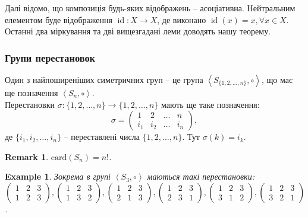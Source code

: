 \documentclass[a4paper, 10pt]{article}
\theoremstyle{theoremdd}
\theoremstyle{theoremdd}
\theoremstyle{theoremdd}
\theoremstyle{theoremdd}
\theoremstyle{theoremdd}
\newtheorem{example}[theorem]{Example}
\theoremstyle{theoremdd}
\theoremstyle{theoremdd}
\theoremstyle{theoremdd}
\theoremstyle{theoremdd}
\theoremstyle{theoremdd}
\theoremstyle{theoremdd}
\newtheorem{remark}[theorem]{Remark}
\theoremstyle{theoremdd}
\theoremstyle{theoremdd}
\theoremstyle{theoremdd}
\theoremstyle{theoremdd}
\DeclareMathOperator{\id}{id}
\begin{document}
Далі відомо, що композиція будь-яких відображень -- асоціативна. Нейтральним елементом буде відображення $\id \colon X \to X$, де виконано $\id(x) = x, \forall x \in X$.\\
Останні два міркування та дві вищезгадані леми доводять нашу теорему.

\subsubsection{Групи перестановок}
Один з найпоширеніших симетричних груп -- це група $\left<S_{\{1,2,\dots,n\}}, \circ \right>$, що має ще позначення $\left<S_n, \circ \right>$.\\
Перестановки $\sigma \colon \{1,2,\dots,n\} \to \{1,2,\dots,n\}$ мають ще таке позначення:
$$ \sigma = \begin{pmatrix}
1 & 2 & \dots & n \\
i_1 & i_2 & \dots & i_n
\end{pmatrix},$$
де $\{i_1,i_2,\dots,i_n\}$ -- переставлені числа $\{1,2,\dots,n\}$. Тут $\sigma(k) = i_k$.

\begin{remark}
$\text{card}(S_n) = n!$.
\end{remark}

\begin{example}
Зокрема в групі $\left< S_3, \circ \right>$ маються такі перестановки:\\
$\begin{pmatrix}
1 & 2 & 3 \\
1 & 2 & 3
\end{pmatrix}, \begin{pmatrix}
1 & 2 & 3 \\
1 & 3 & 2
\end{pmatrix}, \begin{pmatrix}
1 & 2 & 3 \\
2 & 1 & 3
\end{pmatrix}, \begin{pmatrix}
1 & 2 & 3 \\
2 & 3 & 1
\end{pmatrix}, \begin{pmatrix}
1 & 2 & 3 \\
3 & 1 & 2
\end{pmatrix}, \begin{pmatrix}
1 & 2 & 3 \\
3 & 2 & 1
\end{pmatrix}$.
\end{example}
\end{document}
